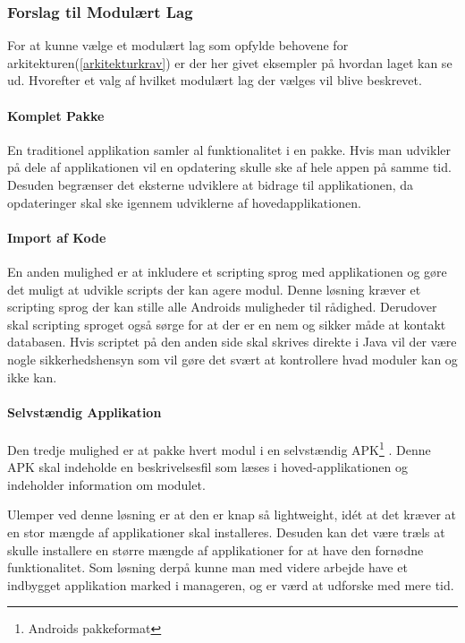 \subsubsection{Forslag til Modulært Lag}
For at kunne vælge et modulært lag som opfylde behovene for arkitekturen(\cref{arkitekturkrav}) er der her givet eksempler på hvordan laget kan se ud.
Hvorefter et valg af hvilket modulært lag der vælges vil blive beskrevet.

\paragraph{Komplet Pakke}
En traditionel applikation samler al funktionalitet i en pakke.
Hvis man udvikler på dele af applikationen vil en opdatering skulle ske af hele appen på samme tid.
Desuden begrænser det eksterne udviklere at bidrage til applikationen, da opdateringer skal ske igennem udviklerne af hovedapplikationen.

\paragraph{Import af Kode}
En anden mulighed er at inkludere et scripting sprog med applikationen og gøre det muligt at udvikle scripts der kan agere modul.
Denne løsning kræver et scripting sprog der kan  stille alle Androids muligheder til rådighed.
Derudover skal scripting sproget også sørge for at der er en nem og sikker måde at kontakt databasen.
Hvis scriptet på den anden side skal skrives direkte i Java vil der være nogle sikkerhedshensyn som vil gøre det svært at kontrollere hvad moduler kan og ikke kan.

\paragraph{Selvstændig Applikation}
Den tredje mulighed er at pakke hvert modul i en selvstændig APK\footnote{Androids pakkeformat} \citep{misc:apk}.
Denne APK skal indeholde en beskrivelsesfil som læses i hoved-applikationen og indeholder information om modulet.

Ulemper ved denne løsning er at den er knap så lightweight, idét at det kræver at en stor mængde af applikationer skal installeres.
Desuden kan det være træls at skulle installere en større mængde af applikationer for at have den fornødne funktionalitet.
Som løsning derpå kunne man med videre arbejde have et indbygget applikation marked i manageren, og er værd at udforske med mere tid.

